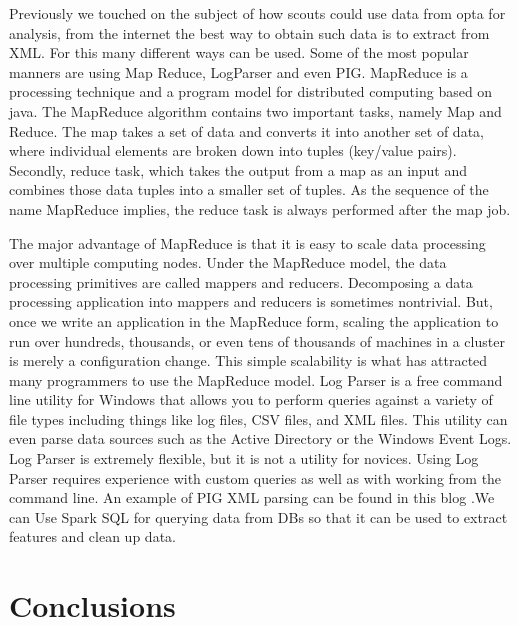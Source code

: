 \documentclass[sigconf]{acmart}
\begin{document}
Previously we touched on the subject of how scouts could use data from opta for analysis, from the internet the best way to obtain such data is to extract from XML. For this many different ways can be used. Some of the most popular manners are using Map Reduce, LogParser and even PIG.\newline
MapReduce is a processing technique and a program model for distributed computing based on java. The MapReduce algorithm contains two important tasks, namely Map and Reduce. The map takes a set of data and converts it into another set of data, where individual elements are broken down into tuples (key/value pairs). Secondly, reduce task, which takes the output from a map as an input and combines those data tuples into a smaller set of tuples. As the sequence of the name MapReduce implies, the reduce task is always performed after the map job.

The major advantage of MapReduce is that it is easy to scale data processing over multiple computing nodes. Under the MapReduce model, the data processing primitives are called mappers and reducers. Decomposing a data processing application into mappers and reducers is sometimes nontrivial. But, once we write an application in the MapReduce form, scaling the application to run over hundreds, thousands, or even tens of thousands of machines in a cluster is merely a configuration change. This simple scalability is what has attracted many programmers to use the MapReduce model.\cite{Tutorialspoint2000}\newline
Log Parser is a free command line utility for Windows that allows you to perform queries against a variety of file types including things like log files, CSV files, and XML files. This utility can even parse data sources such as the Active Directory or the Windows Event Logs.
Log Parser is extremely flexible, but it is not a utility for novices. Using Log Parser requires experience with custom queries as well as with working from the command line.
An example of PIG XML parsing can be found in this blog \cite{learnbigdataanalytics2000}.We can Use Spark SQL for querying data from DBs so that it can be used to extract features and clean up data. 

\section{Conclusions}
\end{document}
